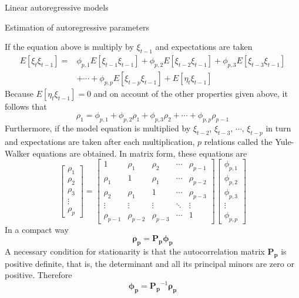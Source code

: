 \documentclass[8pt]{beamer}
\renewcommand{\emph}[1]{\textcolor{myorange}{#1}}
\begin{document}
\begin{frame}{Linear autoregressive models}
        \begin{block}{Estimation of autoregressive parameters}
    \end{block}
    If the equation above is multiply by $\xi_{t-1}$ and \emph{expectations} are taken
    \begin{align*}
        E[\xi_t \xi_{t-1}] = &\phi_{p,1} E[\xi_{t-1} \xi_{t-1}] + \phi_{p,2} E[\xi_{t-2} \xi_{t-1}] + \phi_{p,3} E[\xi_{t-3} \xi_{t-1}] \\
                             &+ \cdots + \phi_{p,p} E[\xi_{t-p} \xi_{t-1}] + E[\eta_t \xi_{t-1}]
    \end{align*}
    Because $E[\eta_t \xi_{t-1}]=0$ and on account of the other properties given above, it follows that
    \[
        \rho_1 = \phi_{p,1} + \phi_{p,2} \rho_1 + \phi_{p,3} \rho_2 + \cdots + \phi_{p,p} \rho_{p-1}
    \]
    Furthermore, if the model equation is multiplied by $\xi_{t-2}$, $\xi_{t-3}$, $\cdots$, $\xi_{t-p}$ in turn and expectations are taken after each multiplication, $p$ relations called the \alert{Yule-Walker} equations are obtained. In matrix form, these equations are
    \begin{equation}
\begin{bmatrix}
\rho_1 \\
\rho_2 \\
\rho_3 \\
\vdots \\
\rho_p
\end{bmatrix}
=
\begin{bmatrix}
    1 & \rho_{1} & \rho_{2} & \cdots & \rho_{p-1} \\
    \rho_{1} & 1 & \rho_{1} & \cdots & \rho_{p-2} \\
    \rho_{2} & \rho_{1} & 1 & \cdots & \rho_{p-3} \\
    \vdots & \vdots & \vdots & \ddots & \vdots \\
    \rho_{p-1} & \rho_{p-2} & \rho_{p-3} & \cdots & 1
\end{bmatrix}
\begin{bmatrix}
    \phi_{p,1} \\
    \phi_{p,2} \\
    \phi_{p,3} \\
\vdots \\
\phi_{p,p} 
\end{bmatrix}
\label{e44}
    \end{equation}
In a compact way
\[
    \mathbf{\rho_p} = \mathbf{P_p} \mathbf{\phi_p}
\]
A necessary condition for \emph{stationarity} is that the autocorrelation matrix $\mathbf{P_p}$ is \emph{positive definite}, that is, the determinant and all its principal minors are zero or positive. Therefore
\[
    \mathbf{\phi_p} = \mathbf{P_p}^{-1} \mathbf{\rho_p}
\]
\end{frame}
\end{document}
